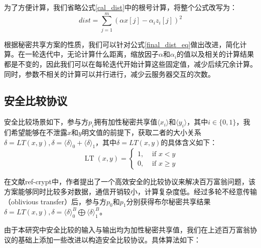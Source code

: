 为了方便计算，我们省略公式\ref{cal_dist}中的根号计算，将整个公式改写为：
\begin{equation}
    \label{final_dist_eq}
    dist = \sum_{j=1}^{m}(\alpha x[j] - \alpha_{i}z_i[j])^2
\end{equation}

根据秘密共享方案的性质，我们可以针对公式\ref{final_dist_eq}做出改进，简化计算。在一轮迭代中，无论计算什么距离，缩放因子$\alpha$和$\alpha_i$的值以及相关的计算结果都是不变的，因此我们可以在每轮迭代开始计算这些固定值，减少后续冗余计算。同时，参数不相关的计算可以并行进行，减少云服务器交互的次数。

\subsection{安全比较协议}
安全比较场景如下，参与方$p_i$拥有加性秘密共享值$\langle x_i \rangle$和$\langle y_i \rangle$，其中$i \in \{0, 1\}$，我们希望能够在不泄露$x$和$y$明文值的前提下，获取二者的大小关系$\delta = LT(x, y), \delta = \langle \delta \rangle_0 + \langle \delta \rangle_1$，其中$\delta = LT(x, y)$的具体含义如下：
\begin{equation}
    \operatorname{LT}(x, y)= \begin{cases}1, & \text { if } x<y \\ 0, & \text { if } x \geq y\end{cases}
\end{equation}

在文献ref-crypt中，作者提出了一个高效安全的比较协议来解决百万富翁问题，该方案能够同时比较多对数据，通信开销较小，计算复杂度低。经过多轮不经意传输（oblivious transfer）后，参与方$p_0$和$p_1$分别获得布尔秘密共享结果$\delta = LT(x, y) ,\delta = \langle \delta \rangle^B_0 \bigoplus \langle \delta \rangle^B_1$。

由于本研究中安全比较的输入与输出均为加性秘密共享值，我们在上述百万富翁协议的基础上添加一些改进以构造安全比较协议。具体算法如下：

